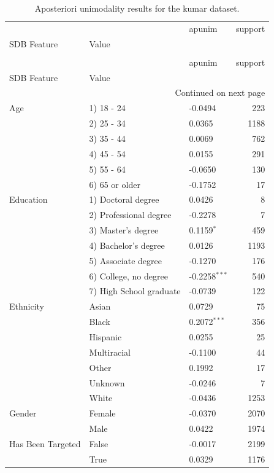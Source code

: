 \begin{longtable}[ht]{lllr}
\caption{Aposteriori unimodality results for the kumar dataset.} \label{tab:kumar} \\
\toprule
 &  & apunim & support \\
SDB Feature & Value &  &  \\
\midrule
\endfirsthead
\caption[]{Aposteriori unimodality results for the kumar dataset.} \\
\toprule
 &  & apunim & support \\
SDB Feature & Value &  &  \\
\midrule
\endhead
\midrule
\multicolumn{4}{r}{Continued on next page} \\
\midrule
\endfoot
\bottomrule
\endlastfoot
Age & 1) 18 - 24 & -0.0494 & 223 \\
 & 2) 25 - 34 & 0.0365 & 1188 \\
 & 3) 35 - 44 & 0.0069 & 762 \\
 & 4) 45 - 54 & 0.0155 & 291 \\
 & 5) 55 - 64 & -0.0650 & 130 \\
 & 6) 65 or older & -0.1752 & 17 \\
Education & 1) Doctoral degree & 0.0426 & 8 \\
 & 2) Professional degree & -0.2278 & 7 \\
 & 3) Master's degree & 0.1159$^{*}$ & 459 \\
 & 4) Bachelor's degree & 0.0126 & 1193 \\
 & 5) Associate degree & -0.1270 & 176 \\
 & 6) College, no degree & -0.2258$^{***}$ & 540 \\
 & 7) High School graduate & -0.0739 & 122 \\
Ethnicity & Asian & 0.0729 & 75 \\
 & Black & 0.2072$^{***}$ & 356 \\
 & Hispanic & 0.0255 & 25 \\
 & Multiracial & -0.1100 & 44 \\
 & Other & 0.1992 & 17 \\
 & Unknown & -0.0246 & 7 \\
 & White & -0.0436 & 1253 \\
Gender & Female & -0.0370 & 2070 \\
 & Male & 0.0422 & 1974 \\
Has Been Targeted & False & -0.0017 & 2199 \\
 & True & 0.0329 & 1176 \\

\end{longtable}
